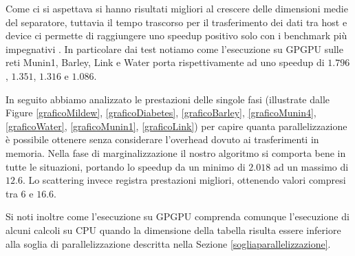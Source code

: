 \documentclass[a4paper]{article}   %
\begin{document}
Come ci si aspettava si hanno risultati migliori al crescere delle dimensioni medie del separatore, tuttavia il tempo trascorso per il trasferimento dei dati tra host e device ci permette di raggiungere uno speedup positivo solo con i benchmark più impegnativi%
.  In particolare dai test notiamo come l'esecuzione su GPGPU sulle reti Munin1, Barley, Link e Water porta rispettivamente ad uno speedup di $1.796$, $1.351$, $1.316$ e $1.086$.  %


In seguito abbiamo analizzato le prestazioni delle singole fasi (illustrate dalle Figure \ref{graficoMildew}, \ref{graficoDiabetes}, \ref{graficoBarley}, \ref{graficoMunin4}, \ref{graficoWater}, \ref{graficoMunin1}, \ref{graficoLink}) per capire quanta parallelizzazione è possibile ottenere senza considerare l'overhead dovuto ai trasferimenti in memoria.
Nella fase di marginalizzazione il nostro algoritmo si comporta bene in tutte le situazioni, portando lo speedup da un minimo di $2.018$ ad un massimo di $12.6$.
Lo scattering invece registra prestazioni migliori, ottenendo valori compresi tra $6$ e $16.6$.

Si noti inoltre come l'esecuzione su GPGPU comprenda comunque l'esecuzione di alcuni calcoli su CPU quando la dimensione della tabella risulta essere inferiore alla soglia di parallelizzazione descritta nella Sezione \ref{sogliaparallelizzazione}.
\end{document}
